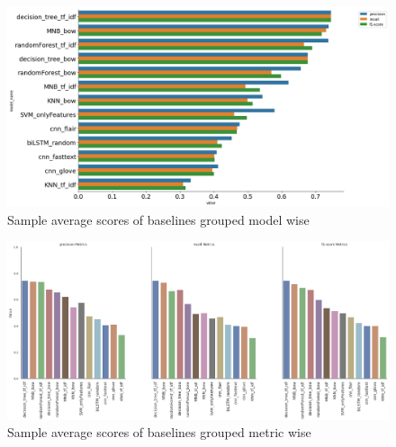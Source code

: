 \begin{figure}[h!]
    \centering
    \includegraphics[width=1\textwidth]{thesis/figures/Model_wise_prf.png}
    \caption{Sample average scores of baselines grouped model wise}
    \label{fig:model_wise_group_baselines}
\end{figure}
\pagebreak
\begin{figure}[]
    \centering
    \includegraphics[width=1\textwidth]{thesis/figures/labelwise_wise_prf _baselines.png}
    \caption{Sample average scores of baselines grouped metric wise}
    \label{fig:label_wise_group_baselines}
\end{figure}

